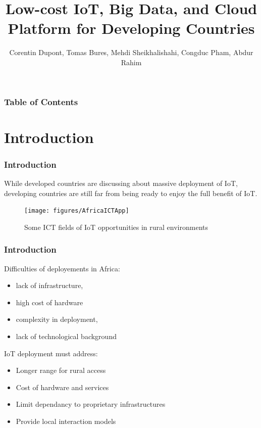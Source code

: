 \documentclass{beamer}
\begin{document}
\title{Low-cost IoT, Big Data, and Cloud Platform for Developing Countries}
\author{Corentin Dupont, Tomas Bures, Mehdi Sheikhalishahi, Congduc Pham, Abdur Rahim}		 



\maketitle

\begin{frame}
  \frametitle{Table of Contents}
  \tableofcontents[]
\end{frame}


\section{Introduction}
\begin{frame}
\frametitle{Introduction}
  
While developed countries are discussing about massive deployment of IoT, developing countries are still far from being ready to enjoy the full benefit of IoT.

  \begin{figure}[H]  
  \centering  
  \texttt{[image: figures/AfricaICTApp]}  
  \caption{Some ICT fields of IoT opportunities in rural environments}   
  \label{figure-AfricaICTApp}  
  \end{figure}

\end{frame}

\begin{frame}
\frametitle{Introduction}
  
  Difficulties of deployements in Africa:
  \begin{itemize}
    \item lack of infrastructure, 
    \item high cost of hardware
    \item complexity in deployment, 
    \item lack of technological background
  \end{itemize}

  IoT deployment must address:
  \begin{itemize}
    \item Longer range for rural access
    \item Cost of hardware and services
    \item Limit dependancy to proprietary infrastructures
    \item Provide local interaction models
  \end{itemize}

\end{frame}
\end{document}
